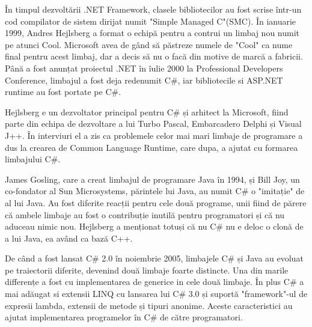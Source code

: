 \documentclass[12pt,a4paper]{article}
\begin{document}
	\par În timpul dezvoltării .NET Framework, clasele bibliotecilor au fost scrise într-un cod compilator de sistem dirijat numit "Simple Managed C"(SMC). În ianuarie 1999, Andres Hejlsberg a format o echipă pentru a contrui un limbaj nou numit pe atunci Cool. Microsoft avea de gând să păstreze numele de "Cool" ca nume final pentru acest limbaj, dar a decis să nu o facă din motive de marcă a fabricii. Până a fost anunțat proiectul .NET în îulie 2000 la Professional Developers Conference, limbajul a fost deja redenumit C\#, iar bibliotecile si ASP.NET runtime au fost portate pe C\#.
	
	\par Hejlsberg e un dezvoltator principal pentru C\# și arhitect la Microsoft, fiind parte din echipa de dezvoltare a lui Turbo Pascal, Embarcadero Delphi și Visual J++. În interviuri el a zis ca problemele celor mai mari limbaje de programare a dus la crearea de Common Language Runtime, care dupa, a ajutat cu formarea limbajului C\#.
	
	\par James Gosling, care a creat limbajul de programare Java în 1994, și Bill Joy, un co-fondator al Sun Microsystems, părintele lui Java, au numit C\# o "imitație" de al lui Java. Au fost diferite reacții pentru cele două programe, unii fiind de părere că ambele limbaje au fost o contribuție inutilă pentru programatori și că nu aduceau nimic nou. Hejlsberg a menționat totuși că nu C\# nu e deloc o clonă de a lui Java, ea având ca bază C++.
	
	\par De când a fost lansat C\# 2.0 în noiembrie 2005, limbajele C\# și Java au evoluat pe traiectorii diferite, devenind două limbaje foarte distincte. Una din marile differențe a fost cu implementarea de generice in cele două limbaje. În plus C\# a mai adăugat si extensii LINQ cu lansarea lui C\# 3.0 și suportă "framework"-ul de expresii lambda, extensii de metode și tipuri anonime. Aceste caracteristici au ajutat implementarea programelor în C\# de către programatori.
	
\end{document}
